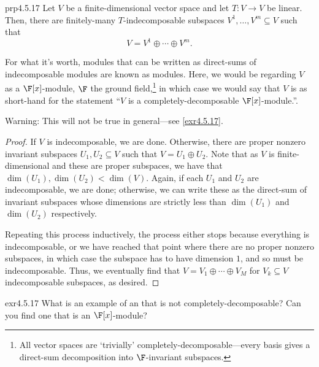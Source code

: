 \begin{prp}{}{prp4.5.17}
	Let $V$ be a finite-dimensional vector space and let $T\colon V\rightarrow V$ be linear.  Then, there are finitely-many $T$-indecomposable subspaces $V^1,\ldots ,V^m\subseteq V$ such that
	\begin{equation}
		V=V^1\oplus \cdots \oplus V^m.
	\end{equation}
	\begin{rmk}
		For what it's worth, modules that can be written as direct-sums of indecomposable modules are known as  modules.  Here, we would be regarding $V$ as a $\F [x]$-module, $\F$ the ground field,\footnote{All vector spaces are `trivially' completely-decomposable---every basis gives a direct-sum decomposition into $\F$-invariant subspaces.} in which case we would say that $V$ is  as short-hand for the statement ``$V$ is a completely-decomposable $\F [x]$-module.''.
	\end{rmk}
	\begin{rmk}
		Warning:  This will not be true in general---see \cref{exr4.5.17}.
	\end{rmk}
	\begin{proof}
		If $V$ is indecomposable, we are done.  Otherwise, there are proper nonzero invariant subspaces $U_1,U_2\subseteq V$ such that $V=U_1\oplus U_2$.  Note that as $V$ is finite-dimensional and these are proper subspaces, we have that $\dim (U_1),\dim (U_2)<\dim (V)$.  Again, if each $U_1$ and $U_2$ are indecomposable, we are done; otherwise, we can write these as the direct-sum of invariant subspaces whose dimensions are strictly less than $\dim (U_1)$ and $\dim (U_2)$ respectively.
		
		Repeating this process inductively, the process either stops because everything is indecomposable, or we have reached that point where there are no proper nonzero subspaces, in which case the subspace has to have dimension $1$, and so must be indecomposable.  Thus, we eventually find that $V=V_1\oplus \cdots \oplus V_M$ for $V_k\subseteq V$ indecomposable subspaces, as desired.
	\end{proof}
\end{prp}
\begin{exr}{}{exr4.5.17}
	What is an example of an that is not completely-decomposable?  Can you find one that is an $\F [x]$-module?
\end{exr}

